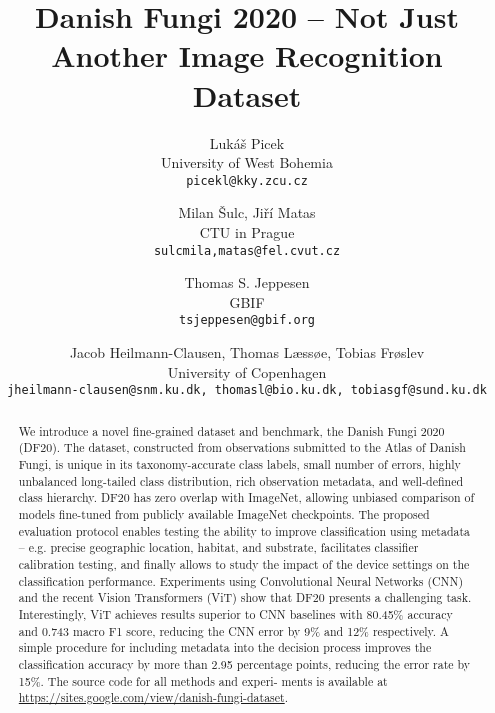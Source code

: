 \documentclass[10pt,twocolumn,letterpaper]{article}
\begin{document}
\title{Danish Fungi 2020 -- Not Just Another Image Recognition Dataset}

\author{
Luk\'{a}\v{s} Picek \\ University of West Bohemia \\ {\tt\small picekl@kky.zcu.cz} 
\and Milan \v{S}ulc, Ji\v{r}\'{i} Matas \\ CTU in Prague \\ {\tt\small {{sulcmila,matas}@fel.cvut.cz}}
\and Thomas S. Jeppesen \\ GBIF \\ {\tt\small tsjeppesen@gbif.org}
\and Jacob Heilmann-Clausen, Thomas Læssøe, Tobias Frøslev \\ University of Copenhagen \\ {\tt\small jheilmann-clausen@snm.ku.dk, thomasl@bio.ku.dk, tobiasgf@sund.ku.dk}
}

\maketitle


\begin{abstract}

We introduce a novel fine-grained dataset and benchmark, the Danish Fungi 2020 (DF20). The dataset, constructed from observations submitted to the Atlas of Danish Fungi, is unique in its taxonomy-accurate class labels, small number of errors, highly unbalanced long-tailed class distribution, rich observation metadata, and well-defined class hierarchy. DF20 has zero overlap with ImageNet, allowing unbiased comparison of models fine-tuned from publicly available ImageNet checkpoints. The proposed evaluation protocol enables testing the ability to improve classification using metadata -- e.g. precise geographic location, habitat, and substrate, facilitates classifier calibration testing, and finally allows to study the impact of the device settings on the classification performance. 
Experiments using Convolutional Neural Networks (CNN) and the recent Vision Transformers (ViT) show that DF20 presents a challenging task. Interestingly, ViT achieves results superior to CNN baselines with 80.45\% accuracy and 0.743 macro F1 score, reducing the CNN error by 9\% and 12\% respectively. A simple procedure for including metadata into the decision process improves the classification accuracy by more than 2.95 percentage points, reducing the error rate by 15\%. The source code for all methods and experi- ments is available at \url{https://sites.google.com/view/danish-fungi-dataset}.

\end{abstract}
\end{document}
